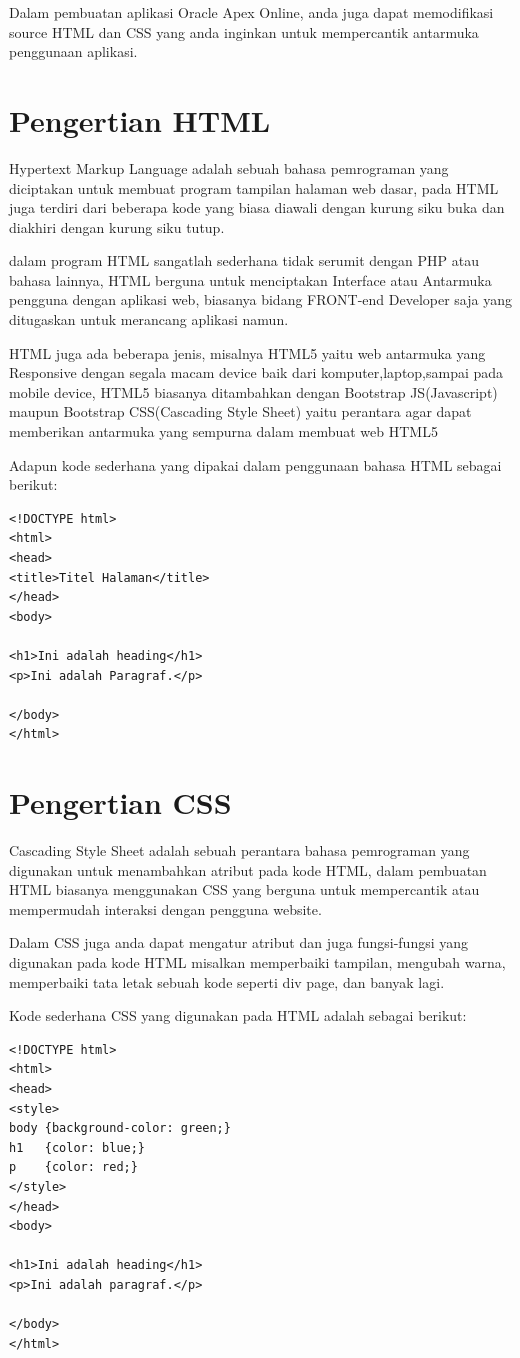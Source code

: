 Dalam pembuatan aplikasi Oracle Apex Online, anda juga dapat memodifikasi source HTML dan CSS yang anda inginkan untuk mempercantik antarmuka penggunaan aplikasi.
\section{Pengertian HTML}
Hypertext Markup Language adalah sebuah bahasa pemrograman yang diciptakan untuk membuat program tampilan halaman web dasar, pada HTML juga terdiri dari beberapa kode yang biasa diawali dengan kurung siku buka dan diakhiri dengan kurung siku tutup.
\par dalam program HTML sangatlah sederhana tidak serumit dengan PHP atau bahasa lainnya, HTML berguna untuk menciptakan Interface atau Antarmuka pengguna dengan aplikasi web, biasanya bidang FRONT-end Developer saja yang ditugaskan untuk merancang aplikasi namun.
\par HTML juga ada beberapa jenis, misalnya HTML5 yaitu web antarmuka yang Responsive dengan segala macam device baik dari komputer,laptop,sampai pada mobile device, HTML5 biasanya ditambahkan dengan Bootstrap JS(Javascript) maupun Bootstrap CSS(Cascading Style Sheet) yaitu perantara agar dapat memberikan antarmuka yang sempurna dalam membuat web HTML5
\par Adapun kode sederhana yang dipakai dalam penggunaan bahasa HTML sebagai berikut:
\begin{lstlisting}
<!DOCTYPE html>
<html>
<head>
<title>Titel Halaman</title>
</head>
<body>

<h1>Ini adalah heading</h1>
<p>Ini adalah Paragraf.</p>

</body>
</html>
\end{lstlisting}

\section{Pengertian CSS}
Cascading Style Sheet adalah sebuah perantara bahasa pemrograman yang digunakan untuk menambahkan atribut pada kode HTML, dalam pembuatan HTML biasanya menggunakan CSS yang berguna untuk mempercantik atau mempermudah interaksi dengan pengguna website.
\par Dalam CSS juga anda dapat mengatur atribut dan juga fungsi-fungsi yang digunakan pada kode HTML misalkan memperbaiki tampilan, mengubah warna, memperbaiki tata letak sebuah kode seperti div page, dan banyak lagi.
\par Kode sederhana CSS yang digunakan pada HTML adalah sebagai berikut:
\begin{lstlisting}
<!DOCTYPE html>
<html>
<head>
<style>
body {background-color: green;}
h1   {color: blue;}
p    {color: red;}
</style>
</head>
<body>

<h1>Ini adalah heading</h1>
<p>Ini adalah paragraf.</p>

</body>
</html>
\end{lstlisting}

